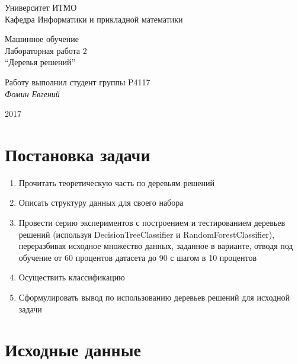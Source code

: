 \documentclass[12pt, a4paper] {article}
\begin{document}
\thispagestyle{empty}
\begin{center}
  {\large
    Университет ИТМО \\
    Кафедра Информатики и прикладной математики \\
  }
\end{center}
\begin{center}
  {\large
    Машинное обучение\\
  }
  {\large
    Лабораторная работа 2\\
    ``Деревья решений''\\
  }
\end{center}
\begin{flushright}
  Работу выполнил студент группы P4117\\
  {\it Фомин Евгений\\
  }
\end{flushright}
\begin{center}
  2017
\end{center}
\newpage

\section{Постановка задачи}

\begin{enumerate}
  \item Прочитать теоретическую часть по деревьям решений
  \item Описать структуру данных для своего набора
  \item Провести серию экспериментов с построением
    и тестированием деревьев решений (используя DecisionTreeClassifier и RandomForestClassifier),
    переразбивая исходное множество данных, заданное в варианте, отводя под обучение
    от 60 процентов датасета до 90 с шагом в 10 процентов
  \item Осуществить классификацию
  \item Сформулировать вывод по использованию деревьев решений для исходной задачи
\end{enumerate}

\section{Исходные данные}
\end{document}
